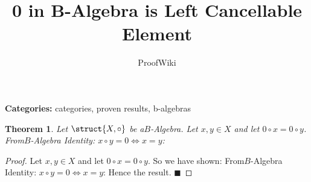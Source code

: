 \documentclass{article}
\title{0 in B-Algebra is Left Cancellable Element}
\author{ProofWiki}
\date{}
\newtheorem{theorem}{Theorem}
\begin{document}
\maketitle

\noindent\textbf{Categories:} categories, proven results, b-algebras

\begin{theorem}
Let $\struct {X, \circ}$ be a$B$-Algebra. Let $x, y \in X$ and let $0 \circ x = 0 \circ y$. From$B$-Algebra Identity: $x \circ y = 0 \iff x = y$:
\end{theorem}

\begin{proof}
Let $x, y \in X$ and let $0 \circ x = 0 \circ y$. So we have shown: From$B$-Algebra Identity: $x \circ y = 0 \iff x = y$: Hence the result. $\blacksquare$
\end{proof}
\end{document}
